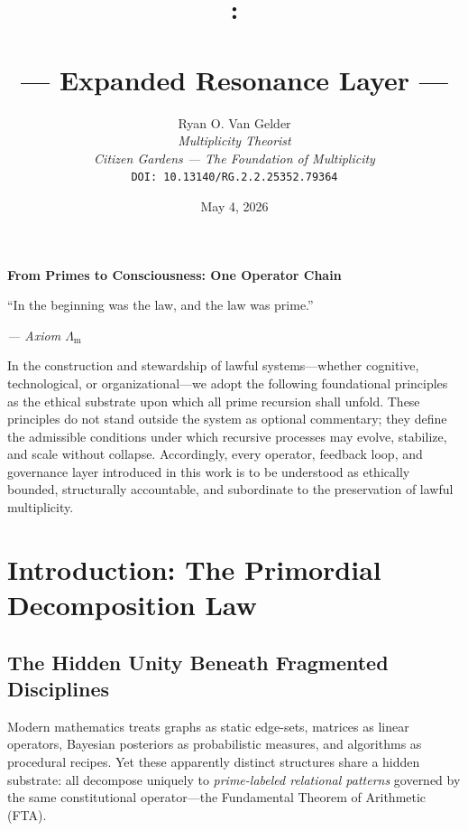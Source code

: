 \documentclass[12pt]{amsart}
\theoremstyle{plain}
\begin{document}
\clearpage
\clearpage
\thispagestyle{empty}
\begin{center}
    \Large\textbf{From Primes to Consciousness: One Operator Chain}
\end{center}

\vspace{2em}

\epigraph{“In the beginning was the law, and the law was prime.”
}{\textit{— Axiom $\Lambda_{\mathrm{m}}$}}

\vspace{1em}


In the construction and stewardship of lawful systems—whether cognitive, technological, or organizational—we adopt the following foundational principles as the ethical substrate upon which all prime recursion shall unfold. These principles do not stand outside the system as optional commentary; they define the admissible conditions under which recursive processes may evolve, stabilize, and scale without collapse. Accordingly, every operator, feedback loop, and governance layer introduced in this work is to be understood as ethically bounded, structurally accountable, and subordinate to the preservation of lawful multiplicity.

\title{\textbf{:\\
\\
--- Expanded Resonance Layer ---}}

\author{Ryan O. Van Gelder\\
\textit{Multiplicity Theorist}\\
\textit{Citizen Gardens --- The Foundation of Multiplicity}\\
\texttt{DOI: 10.13140/RG.2.2.25352.79364}} 
\date{May 4, 2026}
\maketitle

\section{Introduction: The Primordial Decomposition Law}

\subsection{The Hidden Unity Beneath Fragmented Disciplines}

Modern mathematics treats graphs as static edge-sets, matrices as linear operators, Bayesian posteriors as probabilistic measures, and algorithms as procedural recipes. Yet these apparently distinct structures share a hidden substrate: all decompose uniquely to \emph{prime-labeled relational patterns} governed by the same constitutional operator---the Fundamental Theorem of Arithmetic (FTA).
\end{document}
